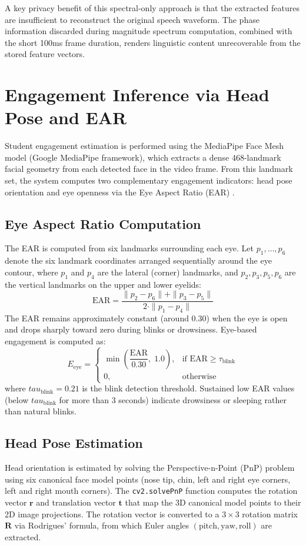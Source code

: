 \documentclass[12pt,a4paper,oneside]{report}
\begin{document}
A key privacy benefit of this spectral-only approach is that the extracted features are insufficient to reconstruct the original speech waveform. The phase information discarded during magnitude spectrum computation, combined with the short 100ms frame duration, renders linguistic content unrecoverable from the stored feature vectors.

\section{Engagement Inference via Head Pose and EAR}
Student engagement estimation is performed using the MediaPipe Face Mesh model (Google MediaPipe framework), which extracts a dense 468-landmark facial geometry from each detected face in the video frame. From this landmark set, the system computes two complementary engagement indicators: head pose orientation and eye openness via the Eye Aspect Ratio (EAR) \cite{soukupova2016ear}.

\subsection{Eye Aspect Ratio Computation}
The EAR is computed from six landmarks surrounding each eye. Let $p_1, \ldots, p_6$ denote the six landmark coordinates arranged sequentially around the eye contour, where $p_1$ and $p_4$ are the lateral (corner) landmarks, and $p_2, p_3, p_5, p_6$ are the vertical landmarks on the upper and lower eyelids:
\begin{equation}
    \text{EAR} = \frac{\|p_2 - p_6\| + \|p_3 - p_5\|}{2 \cdot \|p_1 - p_4\|}
\end{equation}
The EAR remains approximately constant (around 0.30) when the eye is open and drops sharply toward zero during blinks or drowsiness. Eye-based engagement is computed as:
\begin{equation}
    E_{\text{eye}} = \begin{cases}
        \min\left(\dfrac{\text{EAR}}{0.30},\; 1.0\right), & \text{if } \text{EAR} \geq \tau_{\text{blink}} \\[6pt]
        0, & \text{otherwise}
    \end{cases}
\end{equation}
where $\textit{tau}_{\text{blink}} = 0.21$ is the blink detection threshold. Sustained low EAR values (below $\textit{tau}_{\text{blink}}$ for more than 3 seconds) indicate drowsiness or sleeping rather than natural blinks.

\subsection{Head Pose Estimation}
Head orientation is estimated by solving the Perspective-n-Point (PnP) problem \cite{lepetit2009epnp} using six canonical face model points (nose tip, chin, left and right eye corners, left and right mouth corners). The \texttt{cv2.solvePnP} function computes the rotation vector $\mathbf{r}$ and translation vector $\mathbf{t}$ that map the 3D canonical model points to their 2D image projections. The rotation vector is converted to a $3 \times 3$ rotation matrix $\mathbf{R}$ via Rodrigues' formula, from which Euler angles $(\text{pitch}, \text{yaw}, \text{roll})$ are extracted.
\end{document}
